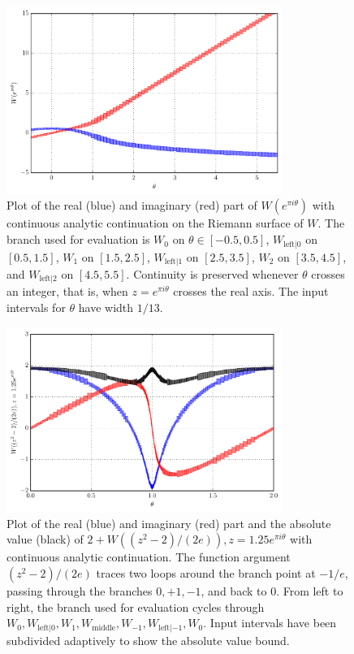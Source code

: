 \documentclass[11pt,a4paper]{article}
\begin{document}
\begin{figure}
\begin{centering}
\includegraphics[width=0.8\textwidth]{plottheta}
\caption{
Plot of the real (blue) and imaginary (red) part of $W(e^{\pi i \theta})$
with continuous analytic continuation
on the Riemann surface of $W$. The branch used for evaluation is
$W_0$ on $\theta \in [-0.5,0.5]$, $W_{\mathrm{left}|0}$ on $[0.5,1.5]$,
$W_1$ on $[1.5,2.5]$, $W_{\mathrm{left}|1}$ on $[2.5,3.5]$,
$W_2$ on $[3.5,4.5]$, and $W_{\mathrm{left}|2}$ on $[4.5,5.5]$.
Continuity is preserved whenever $\theta$ crosses an integer, that
is, when $z = e^{\pi i \theta}$ crosses the real axis.
The input intervals for $\theta$ have width $1/13$.
}
\end{centering}
\end{figure}

\begin{figure}
\begin{centering}
\includegraphics[width=0.8\textwidth]{plotbb}
\caption{
Plot of the real (blue) and imaginary (red) part and the absolute
value (black) of $2 + W((z^2-2)/(2e)), z = 1.25 e^{\pi i \theta}$
with continuous analytic continuation.
The function argument $(z^2-2)/(2e)$ traces two loops around the branch point at $-1/e$,
passing through the branches $0, +1, -1$, and back to $0$.
From left to right,
the branch used for evaluation
cycles through $W_0, W_{\mathrm{left}|0}, W_1, W_{\mathrm{middle}}, W_{-1}, W_{\mathrm{left}|-1}, W_0$.
Input intervals have been subdivided adaptively to show the absolute value bound.
}
\label{fig:bcircle}
\end{centering}
\end{figure}
\end{document}
